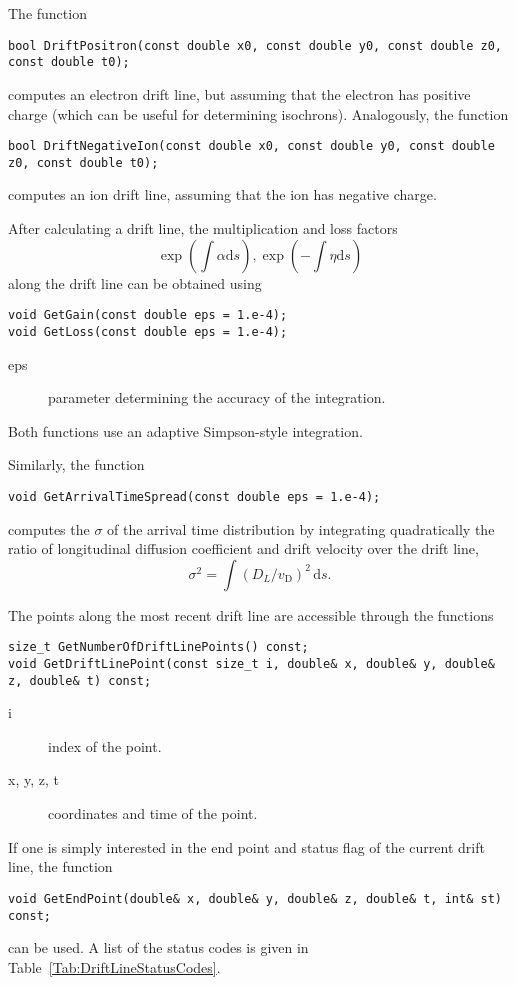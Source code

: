 The function 
\begin{lstlisting}
bool DriftPositron(const double x0, const double y0, const double z0, const double t0);
\end{lstlisting}
computes an electron drift line, but assuming that the electron has positive charge 
(which can be useful for determining isochrons). Analogously, the function
\begin{lstlisting}
bool DriftNegativeIon(const double x0, const double y0, const double z0, const double t0);
\end{lstlisting}
computes an ion drift line, assuming that the ion has negative charge.

After calculating a drift line, the multiplication and loss factors 
\begin{equation*}
  \exp\left(\int\alpha\text{d}s\right), \exp\left(-\int\eta\text{d}s\right)
\end{equation*}
along the drift line can be obtained using 
\begin{lstlisting}
void GetGain(const double eps = 1.e-4);
void GetLoss(const double eps = 1.e-4);
\end{lstlisting}
\begin{description}
  \item[eps] parameter determining the accuracy of the integration.
\end{description}
Both functions use an adaptive Simpson-style integration.

Similarly, the function
\begin{lstlisting}
void GetArrivalTimeSpread(const double eps = 1.e-4);
\end{lstlisting}
computes the $\sigma$ of the arrival time distribution by 
integrating quadratically the ratio of longitudinal diffusion coefficient 
and drift velocity over the drift line,
\begin{equation*}
  \sigma^{2} = \int\left(D_{L}/v_{\text{D}}\right)^2\,\text{d}s.
\end{equation*}

The points along the most recent drift line are accessible through the functions
\begin{lstlisting}
size_t GetNumberOfDriftLinePoints() const;
void GetDriftLinePoint(const size_t i, double& x, double& y, double& z, double& t) const;
\end{lstlisting}
\begin{description}
  \item[i] index of the point.
  \item[x, y, z, t] coordinates and time of the point. 
\end{description}
If one is simply interested in the end point and status flag of the 
current drift line, the function
\begin{lstlisting}
void GetEndPoint(double& x, double& y, double& z, double& t, int& st) const;
\end{lstlisting}
can be used. A list of the status codes 
is given in Table~\ref{Tab:DriftLineStatusCodes}.


